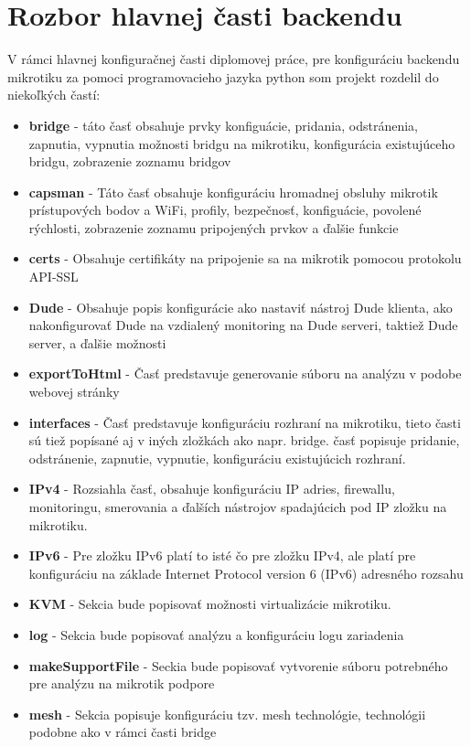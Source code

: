 \section{Rozbor hlavnej časti backendu}
V rámci hlavnej konfiguračnej časti diplomovej práce, pre konfiguráciu backendu mikrotiku za pomoci programovacieho jazyka python som projekt rozdelil do niekoľkých častí:\begin{itemize}
\item \textbf{bridge} - táto časť obsahuje prvky konfiguácie, pridania, odstránenia, zapnutia, vypnutia možnosti bridgu na mikrotiku, konfigurácia existujúceho bridgu, zobrazenie zoznamu bridgov
\item  \textbf{capsman} - Táto časť obsahuje konfiguráciu hromadnej obsluhy mikrotik prístupových bodov a WiFi, profily, bezpečnosť, konfiguácie, povolené rýchlosti, zobrazenie zoznamu pripojených prvkov a ďalšie funkcie
\item \textbf{certs} - Obsahuje certifikáty na pripojenie sa na mikrotik pomocou protokolu API-SSL
\item \textbf{Dude} - Obsahuje popis konfigurácie ako nastaviť nástroj Dude klienta, ako nakonfigurovať Dude na vzdialený monitoring na Dude serveri, taktiež Dude server, a ďalšie možnosti
\item \textbf{exportToHtml} - Časť predstavuje generovanie súboru na analýzu v podobe webovej stránky
\item \textbf{interfaces} - Časť predstavuje konfiguráciu rozhraní na mikrotiku, tieto časti sú tiež popísané aj v iných zložkách ako napr. bridge. časť popisuje pridanie, odstránenie, zapnutie, vypnutie, konfiguráciu existujúcich rozhraní.
\item \textbf{IPv4} - Rozsiahla časť, obsahuje konfiguráciu IP adries, firewallu, monitoringu, smerovania a ďalších nástrojov spadajúcich pod IP zložku na mikrotiku.
\item \textbf{IPv6} - Pre zložku IPv6 platí to isté čo pre zložku IPv4, ale platí pre konfiguráciu na základe Internet Protocol version 6 (IPv6) adresného rozsahu
\item \textbf{KVM} - Sekcia bude popisovať možnosti virtualizácie mikrotiku.
\item \textbf{log} - Sekcia bude popisovať analýzu a konfiguráciu logu zariadenia
\item \textbf{makeSupportFile} - Seckia bude popisovať vytvorenie súboru potrebného pre analýzu na mikrotik podpore
\item \textbf{mesh} - Sekcia popisuje konfiguráciu tzv. mesh technológie, technológii podobne ako  v rámci časti bridge

\end{itemize}
